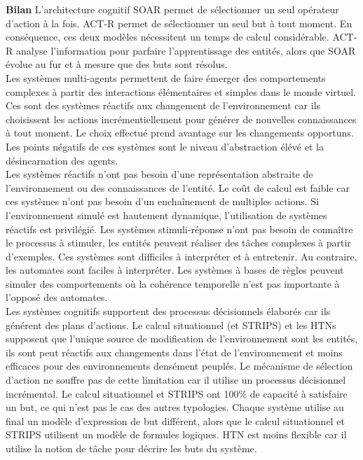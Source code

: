 \documentclass[11pt]{article}
\begin{document}
\textbf{Bilan}
L'architecture cognitif SOAR permet de sélectionner un seul opérateur d'action à la fois. ACT-R permet de sélectionner un seul but à tout moment. En conséquence, ces deux modèles nécessitent un temps de calcul considérable. ACT-R analyse l'information pour parfaire l'apprentissage des entités, alors que SOAR évolue au fur et à mesure que des buts sont résolus.\\
Les systèmes multi-agents permettent de faire émerger des comportements complexes à partir des interactions élémentaires et simples dans le monde virtuel. Ces sont des systèmes réactifs aux changement de l'environnement car ils choisissent les actions incrémentiellement pour générer de nouvelles connaissances à tout moment. Le choix effectué prend avantage sur les changements opportuns. Les points négatifs de ces systèmes sont le niveau d'abstraction élévé et la désincarnation des agents.\\
Les systèmes réactifs n'ont pas besoin d'une représentation abstraite de l'environnement ou des connaissances de l'entité. Le coût de calcul est faible car ces systèmes n'ont pas besoin d'un enchaînement de multiples actions. Si l'environnement simulé est hautement dynamique, l'utilisation de systèmes réactifs est privilégié. Les systèmes stimuli-réponse n'ont pas besoin de connaître le processus à stimuler, les entités peuvent réaliser des tâches complexes à partir d'exemples. Ces systèmes sont difficiles à interpréter et à entretenir. Au contraire, les automates sont faciles à interpréter. Les systèmes à bases de règles peuvent simuler des comportements où la cohérence temporelle n'est pas importante à l'opposé des automates.\\
Les systèmes cognitifs supportent des processus décisionnels élaborés car ils générent des plans d'actions. Le calcul situationnel (et STRIPS) et les HTNs supposent que l'unique source de modification de l'environnement sont les entités, ils sont peut réactifs aux changements dans l'état de l'environnement et moins efficaces pour des environnements densément peuplés. Le mécanisme de sélection d'action ne souffre pas de cette limitation car il utilise un processus décisionnel incrémental. Le calcul situationnel et STRIPS ont 100\% de capacité à satisfaire un but, ce qui n'est pas le cas des autres typologies. Chaque système utilise au final un modèle d'expression de but différent, alors que le calcul situationnel et STRIPS utilisent un modèle de formules logiques. HTN est moins flexible car il utilise la notion de tâche pour décrire les buts du système.
\end{document}
